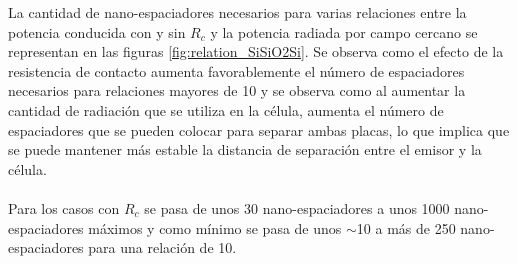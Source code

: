 La cantidad de nano-espaciadores necesarios para varias relaciones entre la potencia conducida con y sin $R_c$ y la potencia radiada por campo cercano  se representan en las figuras \ref{fig:relation_SiSiO2Si}. Se observa como el efecto de la resistencia de contacto aumenta favorablemente el número de espaciadores necesarios para relaciones mayores de 10 y se observa como al aumentar la cantidad de radiación que se utiliza en la célula, aumenta el número de espaciadores que se pueden colocar para separar ambas placas, lo que implica que se puede mantener más estable la distancia de separación entre el emisor y la célula.\\\\
 Para los casos con $R_c$ se pasa de unos 30 nano-espaciadores a unos 1000 nano-espaciadores máximos y como mínimo se pasa de unos $\sim$10 a más de 250 nano-espaciadores para una relación de 10.
